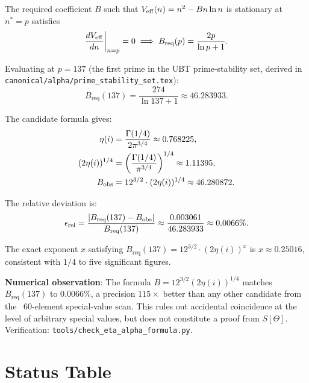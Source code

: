 \documentclass[12pt,a4paper]{article}
\theoremstyle{definition}
\theoremstyle{remark}
\newcommand{\Breq}{B_{\mathrm{req}}}
\begin{document}
The required coefficient $B$ such that $V_{\rm eff}(n) = n^2 - Bn\ln n$
is stationary at $n^* = p$ satisfies
\begin{equation}\label{eq:Breq}
  \frac{dV_{\rm eff}}{dn}\bigg|_{n=p} = 0
  \;\Longrightarrow\;
  \Breq(p) = \frac{2p}{\ln p + 1}.
\end{equation}

Evaluating at $p = 137$ (the first prime in the UBT prime-stability set,
derived in \texttt{canonical/alpha/prime\_stability\_set.tex}):
\begin{equation}\label{eq:Breq137}
  \Breq(137) = \frac{274}{\ln 137 + 1} \approx 46.283933.
\end{equation}

The candidate formula gives:
\begin{align}
  \eta(i) &= \frac{\Gamma(1/4)}{2\pi^{3/4}} \approx 0.768225,
  \label{eq:etai_value}\\
  (2\eta(i))^{1/4} &= \left(\frac{\Gamma(1/4)}{\pi^{3/4}}\right)^{1/4}
    \approx 1.11395,
  \label{eq:2etai_value}\\
  B_{\rm obs} &= 12^{3/2}\cdot(2\eta(i))^{1/4} \approx 46.280872.
  \label{eq:Bobs}
\end{align}

The relative deviation is:
\begin{equation}\label{eq:relative_error}
  \epsilon_{\rm rel}
  = \frac{|\Breq(137) - B_{\rm obs}|}{\Breq(137)}
  \approx \frac{0.003061}{46.283933}
  \approx 0.0066\%.
\end{equation}

The exact exponent $x$ satisfying $\Breq(137) = 12^{3/2}\cdot(2\eta(i))^x$
is $x \approx 0.25016$, consistent with $1/4$ to five significant figures.

\begin{obsbox}
\textbf{Numerical observation}: The formula $B = 12^{3/2}(2\eta(i))^{1/4}$
matches $\Breq(137)$ to $0.0066\%$, a precision $115\times$ better than any
other candidate from the ~60-element special-value scan.  This rules out
accidental coincidence at the level of arbitrary special values, but does
not constitute a proof from $S[\Theta]$.  Verification:
\texttt{tools/check\_eta\_alpha\_formula.py}.
\end{obsbox}

\section{Status Table}
\label{sec:eta:statustable}
\end{document}
